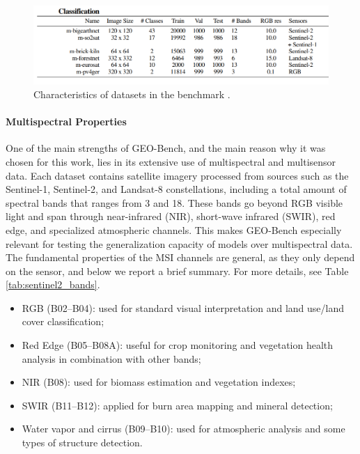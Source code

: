 \documentclass[a4paper, twoside, english]{sapthesis} %
\begin{document}
\begin{figure}[h]
    \centering
    \includegraphics[width=\textwidth]{img/geobench-datasets-classification-info-cut.png}
    \caption{\normalsize Characteristics of datasets in the benchmark \cite{lacoste2023geo}.}
    \label{fig:geoinfo}
\end{figure}


\vspace{-0.5cm}
\paragraph{Multispectral Properties}

One of the main strengths of GEO-Bench, and the main reason why it was chosen for this work, lies in its extensive use of multispectral and multisensor data. Each dataset contains satellite imagery processed from sources such as the Sentinel-1, Sentinel-2, and Landsat-8 constellations, including a total amount of spectral bands that ranges from 3 and 18. These bands go beyond RGB visible light and span through near-infrared (NIR), short-wave infrared (SWIR), red edge, and specialized atmospheric channels. This makes GEO-Bench especially relevant for testing the generalization capacity of models over multispectral data. The fundamental properties of the MSI channels are general, as they only depend on the sensor, and below we report a brief summary. For more details, see Table \ref{tab:sentinel2_bands}.
\begin{itemize}
    \item RGB (B02–B04): used for standard visual interpretation and land use/land cover classification;
    \item Red Edge (B05–B08A): useful for crop monitoring and vegetation health analysis in combination with other bands;
    \item NIR (B08): used for biomass estimation and vegetation indexes;
    \item SWIR (B11–B12): applied for burn area mapping and mineral detection;
    \item Water vapor and cirrus (B09–B10): used for atmospheric analysis and some types of structure detection.
\end{itemize}
\end{document}
